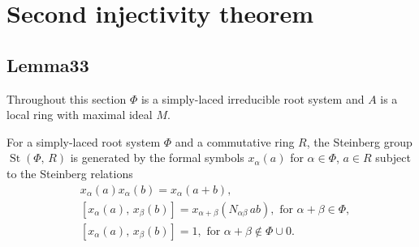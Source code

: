 \documentclass[oneside, 8pt]{amsart}
\theoremstyle{remark}
\theoremstyle{definition}
\DeclareMathOperator{\St}{St}
\numberwithin{equation}{section}
\begin{document}
\section{Second injectivity theorem}
\begin{comment} 
First of all, set $\widetilde{V} = \overline{G}^{\geq 0}_M \times G^{\leq 0} \times (1 + M)^*$
 and consider it as a pointed set, i.\,e. ignore its structure of the group but retain $\widetilde{v_0} = (1, 1, 1)$ as a choice of a basepoint.
We let the group $\St(\Phi, R, M)$ act on $\widetilde{V}$ via the formula 
 $h \cdot (\overline{g}^+, g^-, u) = (\overline{g}^+ \cdot j_+i_+(h), i_-(h)^{-1}\cdot g^-, u)$.
Denote by $V$ the set of orbits of this action with the fixed basepoint $v_0 = O(\widetilde{v}_0)$.
We will use the notation $[\overline{g}^+, g^-, u]$ as a shorthand for $O(\overline{g}^+, g^-, u)$.

It is obvious that the map $\widetilde{p} \colon \widetilde{V} \to \St(\Phi, R[t, t^{-1}])$ given by 
 \[(\overline{g}^+, g^-, u) \mapsto \overline{g}^+ \cdot j_-(g^-) \cdot \{t, u\}\]
 is constant on the orbits of the above action
  and therefore gives rise to a well-defined map $p \colon V \to \St(\Phi, R[t, t^{-1}])$ of pointed sets.

We will construct an action of $\St(\Phi, B)$ on the set $V$ with the following additional properties:
\begin{enumerate}
\item for $g^- \in \St(\Phi, R[t^{-1}])$ one has $\varphi(g^-) \cdot v_0 = [1, g^-, 1]$, where $\varphi$ is the canonical map
  $\St(\Phi, R[t^{-1}]) \to \St(\Phi, B)$ induced by the embedding $R[t^{-1}] \to B$.
\item for $g \in \St(\Phi, B)$ the element $p(g \cdot v_0)$ coincides with the canonical image of $g$ in $\St(\Phi, R[t, t^{-1}])$; 
\end{enumerate} \end{comment}

\subsection{Lemma33}
Throughout this section $\Phi$ is a simply-laced irreducible root system and $A$ is a local ring with maximal ideal $M$.

For a simply-laced root system $\Phi$ and a commutative ring $R$, the Steinberg group $\St(\Phi,\,R)$ is generated by the formal symbols $x_{\alpha}(a)$ for $\alpha\in\Phi$, $a\in R$ subject to the Steinberg relations
\begin{align}
&x_{\alpha}(a)x_{\alpha}(b)=x_{\alpha}(a+b), \tag{R1}\\
&[x_{\alpha}(a),\,x_{\beta}(b)]=x_{\alpha+\beta}(N_{\alpha\beta}\,ab),\text{ for }\alpha+\beta\in\Phi, \tag{R2} \\
&[x_{\alpha}(a),\,x_{\beta}(b)]=1,\text{ for }\alpha+\beta\not\in\Phi\cup0. \tag{R3}
\end{align}
\end{document}
